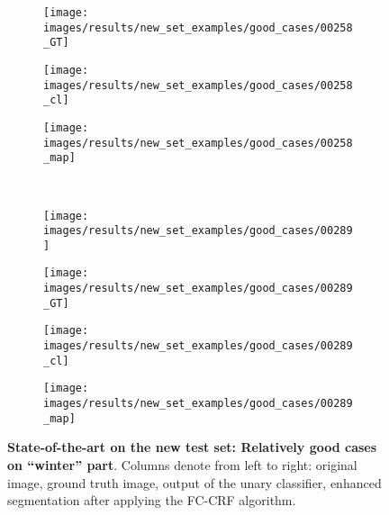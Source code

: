 \begin{figure}[t]
\begin{subfigure}[c]{0.24\textwidth}
 \end{subfigure}
 \begin{subfigure}[c]{0.24\textwidth}
  \centering
  \texttt{[image: images/results/new\_set\_examples/good\_cases/00258\_GT]}
 \end{subfigure}
 \begin{subfigure}[c]{0.24\textwidth}
  \centering
  \texttt{[image: images/results/new\_set\_examples/good\_cases/00258\_cl]}
 \end{subfigure}
 \begin{subfigure}[c]{0.24\textwidth}
  \centering
  \texttt{[image: images/results/new\_set\_examples/good\_cases/00258\_map]}
 \end{subfigure}
 \\
 \begin{subfigure}[c]{0.24\textwidth}
  \centering
  \texttt{[image: images/results/new\_set\_examples/good\_cases/00289]}
 \end{subfigure}
 \begin{subfigure}[c]{0.24\textwidth}
  \centering
  \texttt{[image: images/results/new\_set\_examples/good\_cases/00289\_GT]}
 \end{subfigure}
 \begin{subfigure}[c]{0.24\textwidth}
  \centering
  \texttt{[image: images/results/new\_set\_examples/good\_cases/00289\_cl]}
 \end{subfigure}
 \begin{subfigure}[c]{0.24\textwidth}
  \centering
  \texttt{[image: images/results/new\_set\_examples/good\_cases/00289\_map]}
 \end{subfigure}
 \caption[State-of-the-art on the new test set: Relatively good cases on ``winter'' part]{
 {\bf State-of-the-art on the new test set: Relatively good cases on ``winter'' part}.
 Columns denote from left to right: original image, ground truth image, output of the unary classifier, enhanced segmentation after applying
 the FC-CRF algorithm.}\label{fig:fc_crf_good_winter}
\end{figure}

